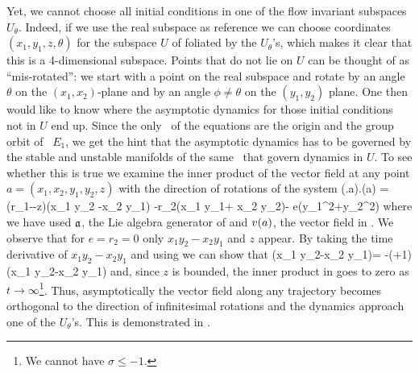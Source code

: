 Yet, we cannot choose all initial conditions
in one of the flow invariant subspaces $U_\theta$. Indeed, if we use the real subspace
as reference we can choose coordinates $(x_1,y_1,z,\theta)$ for the subspace $U$ of 
foliated by the $U_\theta$'s, which makes it clear that this is a 4-dimensional subspace.
Points that do not lie on $U$ can be thought of as ``mis-rotated'': we start with a point on
the real subspace and rotate by an angle $\theta$ on the $(x_1,x_2)$-plane and by an
angle $\phi\neq\theta$ on the $(y_1,y_2)$ plane. One then would like to know where the asymptotic dynamics
for those initial conditions not in $U$ end up. Since the only \eqva\ of the equations are the origin
and the group orbit of \eqv\ $E_1$, we get the hint that the asymptotic dynamics has to be governed
by the stable and unstable manifolds of the same \eqva\ that govern dynamics in $U$.
To see whether this is true we examine the inner product of the vector field at any point  $a=(x_1,x_2,y_1,y_2,z)$  with the direction of
rotations of the system
\beq
	(\Lg.a).\vf(a) = \left(r_1-\sigma-z\right)\left(x_1 y_2 -x_2 y_1\right) -r_2\left(x_1 y_1+ x_2 y_2\right)- e\left(y_1^2+y_2^2\right)
	\label{eq:CLe0ip}
\eeq
where we have used $\mathfrak{a}$, the Lie algebra generator of  and $v(a)$, the vector field in .
We observe that for $e=r_2=0$ only $x_1 y_2-x_2 y_1$ and $z$ appear. By taking the time derivative of $x_1 y_2-x_2 y_1$ and using 
we can show that
\beq
	\left(x_1 y_2-x_2 y_1\right)= -(\sigma+1)\left(x_1 y_2-x_2 y_1\right)
\eeq
and, since $z$ is bounded, the inner product in  goes to zero as $t\rightarrow\infty$\footnote{We cannot have $\sigma\leq -1$.}. Thus, asymptotically the vector
field along any trajectory becomes orthogonal to the direction of infinitesimal rotations and the dynamics approach one of the $U_\theta$'s.
This is demonstrated in .

